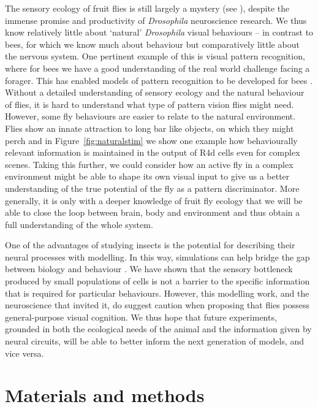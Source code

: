 The sensory ecology of fruit flies is still largely a mystery (see \cite{Dickinson2014}), despite the immense promise and productivity of \emph{Drosophila} neuroscience research.
We thus know relatively little about `natural' \emph{Drosophila} visual behaviours -- in contrast to bees, for which we know much about behaviour but comparatively little about the nervous system.
One pertinent example of this is visual pattern recognition, where for bees we have a good understanding of the real world challenge facing a forager.
This has enabled models of pattern recognition to be developed for bees \cite{Horridge2000}.
Without a detailed understanding of sensory ecology and the natural behaviour of flies, it is hard to understand what type of pattern vision flies might need.
However, some fly behaviours are easier to relate to the natural environment.
Flies show an innate attraction to long bar like objects, on which they might perch \cite{Maimon2008} and in Figure~\ref{fig:naturalstim} we show one example how behaviourally relevant information is maintained in the output of R4d cells even for complex scenes.
Taking this further, we could consider how an active fly in a complex environment might be able to shape its own visual input to give us a better understanding of the true potential of the fly as a pattern discriminator.
More generally, it is only with a deeper knowledge of fruit fly ecology that we will be able to close the loop between brain, body and environment and thus obtain a full understanding of the whole system.

One of the advantages of studying insects is the potential for describing their neural processes with modelling.
In this way, simulations can help bridge the gap between biology and behaviour \cite{Webb2009}.
We have shown that the sensory bottleneck produced by small populations of cells is not a barrier to the specific information that is required for particular behaviours.
However, this modelling work, and the neuroscience that invited it, do suggest caution when proposing that flies possess general-purpose visual cognition.
We thus hope that future experiments, grounded in both the ecological needs of the animal and the information given by neural circuits, will be able to better inform the next generation of models, and vice versa.

\section*{Materials and methods}
